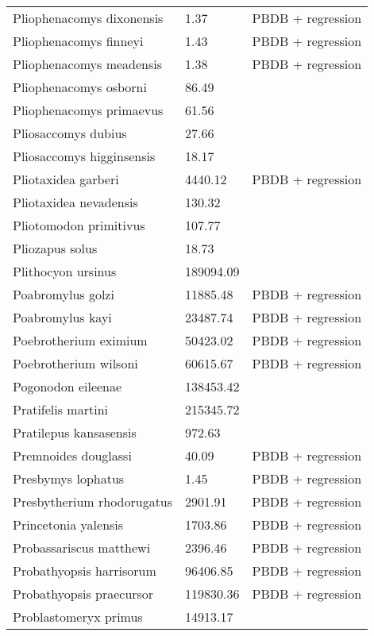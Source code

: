 \documentclass{article}
\begin{document}
\begin{center}
\begin{longtable}{p{} p{} p{}}
    Pliophenacomys dixonensis & 1.37 & PBDB + regression \\ 
    Pliophenacomys finneyi & 1.43 & PBDB + regression \\ 
    Pliophenacomys meadensis & 1.38 & PBDB + regression \\ 
    Pliophenacomys osborni & 86.49 & \cite{Tomiya2013} \\ 
    Pliophenacomys primaevus & 61.56 & \cite{Tomiya2013} \\ 
    Pliosaccomys dubius & 27.66 & \cite{Tomiya2013} \\ 
    Pliosaccomys higginsensis & 18.17 & \cite{Tomiya2013} \\ 
    Pliotaxidea garberi & 4440.12 & PBDB + regression \\ 
    Pliotaxidea nevadensis & 130.32 & \cite{Tomiya2013} \\ 
    Pliotomodon primitivus & 107.77 & \cite{Tomiya2013} \\ 
    Pliozapus solus & 18.73 & \cite{Tomiya2013} \\ 
    Plithocyon ursinus & 189094.09 & \cite{Tomiya2013} \\ 
    Poabromylus golzi & 11885.48 & PBDB + regression \\ 
    Poabromylus kayi & 23487.74 & PBDB + regression \\ 
    Poebrotherium eximium & 50423.02 & PBDB + regression \\ 
    Poebrotherium wilsoni & 60615.67 & PBDB + regression \\ 
    Pogonodon eileenae & 138453.42 & \cite{Fox2011b} \\ 
    Pratifelis martini & 215345.72 & \cite{Tomiya2013} \\ 
    Pratilepus kansasensis & 972.63 & \cite{Tomiya2013} \\ 
    Premnoides douglassi & 40.09 & PBDB + regression \\ 
    Presbymys lophatus & 1.45 & PBDB + regression \\ 
    Presbytherium rhodorugatus & 2901.91 & PBDB + regression \\ 
    Princetonia yalensis & 1703.86 & PBDB + regression \\ 
    Probassariscus matthewi & 2396.46 & PBDB + regression \\ 
    Probathyopsis harrisorum & 96406.85 & PBDB + regression \\ 
    Probathyopsis praecursor & 119830.36 & PBDB + regression \\ 
    Problastomeryx primus & 14913.17 & \cite{Tomiya2013} \\ 

\end{longtable}
\end{center}
\end{document}
